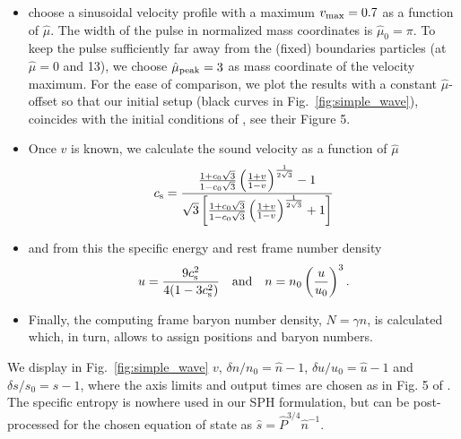 \documentclass{elsart}
\begin{document}
\begin{itemize}
\item choose a sinusoidal velocity profile with a maximum $v_{\rm max}= 0.7$ as a function of
$\hat{\mu}$. The width of the pulse in normalized mass coordinates is 
$\hat{\mu}_0= \pi$.  To keep the pulse sufficiently far away from the (fixed) boundaries particles (at $\hat{\mu}=0$ and 13), we choose $\hat{\mu}_{\rm peak}= 3$ as mass coordinate of the velocity maximum. For the ease 
of comparison, we plot the results with a constant $\hat{\mu}$-offset so that our initial setup (black curves in Fig.~\ref{fig:simple_wave}), coincides with the initial conditions of \cite{anile83}, see their Figure
5.
\item Once $v$ is known, we calculate the sound velocity \cite{liang77,anile83} as a function of $\hat{\mu}$
\begin{equation}
c_{\rm s}= \frac{\frac{1+c_0\sqrt{3}}{1-c_0 \sqrt{3}} \left( \frac{1+v}{1-v}\right)^{\frac{1}{2 \sqrt{3}}} - 1}     {\sqrt{3} \left[ \frac{1+c_0\sqrt{3}}{1-c_0 \sqrt{3}} \left( \frac{1+v}{1-v}\right)^{\frac{1}{2 \sqrt{3}}} + 1\right]}
\end{equation}
\item and from this the specific energy and rest frame number density
\begin{equation}
u= \frac{9 c_{\rm s}^2}{4(1-3c_{\rm s}^2)} \quad {\rm and} \quad n= n_0 \left(\frac{u}{u_0}\right)^3.
\end{equation}
\item Finally, the computing frame baryon number density, $N= \gamma n$, is calculated which, in turn, allows to assign positions and baryon numbers.
\end{itemize}

We display in Fig.~\ref{fig:simple_wave} $v$, $\delta n/n_0= \hat{n}-1$, $\delta u/u_0= \hat{u}-1$ and $\delta s/s_0= \hat{s}-1$, where the axis limits and output times are chosen as in  Fig. 5 of \cite{anile83}. The specific entropy is nowhere used in our SPH formulation, but can be post-processed  for the chosen equation of state as $\hat{s}= \hat{P}^{3/4} \hat{n}^{-1}$.
\end{document}
